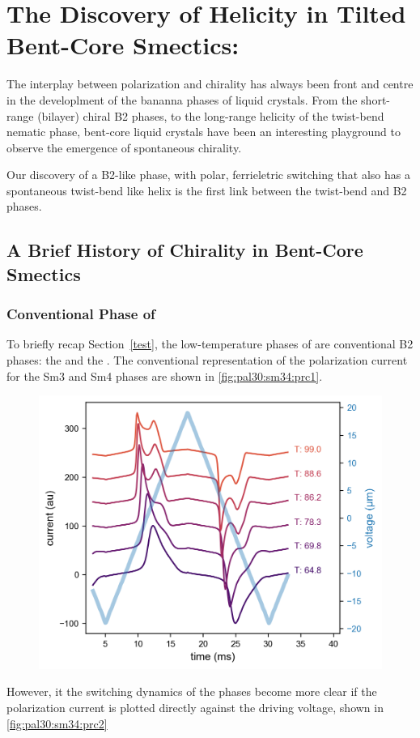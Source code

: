 \documentclass[aagreenthesis]{subfiles}
\begin{document}
\chapter{The Discovery of Helicity in Tilted Bent-Core Smectics: \smcpalpha{}}

The interplay between polarization and chirality has always been front and
centre in the developlment of the bananna phases of liquid crystals. From the
short-range (bilayer) chiral B2 phases\cite{link_spontaneous_1997}, to the
long-range helicity of the twist-bend nematic phase, bent-core liquid crystals
have been an interesting playground to observe the emergence of spontaneous
chirality.

Our discovery of a B2-like phase, with polar, ferrieletric switching that also
has a spontaneous twist-bend like helix is the first link between the
twist-bend and B2 phases.



\section{A Brief History of Chirality in Bent-Core Smectics}


\subsection{Conventional Phase of }

To briefly recap Section~\ref{test}, the low-temperature phases of \nfour{} are conventional B2
phases: the \smcapa{} and the \smcapf{}. 
The conventional representation of the polarization current for the Sm3 and Sm4
phases are shown in \autoref{fig:pal30:sm34:prc1}.


\begin{figure}[h!]
    \centering
    \includegraphics[width=.8\textwidth]{figs/pal30/prc/spacedSmRPRC.png}
    \caption{\label{fig:pal30:sm34:prc1}}
\end{figure}
However, it the switching dynamics of the phases become more clear if the
polarization current is plotted directly against the driving voltage, shown in
\autoref{fig:pal30:sm34:prc2}
\end{document}
